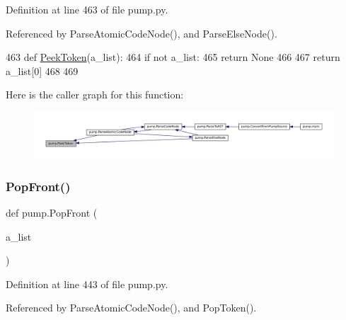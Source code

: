 Definition at line 463 of file pump.\+py.



Referenced by Parse\+Atomic\+Code\+Node(), and Parse\+Else\+Node().


\begin{DoxyCode}
463 \textcolor{keyword}{def }\hyperlink{namespacepump_ab12085e099ab4bd0cd968efdc435ec31}{PeekToken}(a\_list):
464   \textcolor{keywordflow}{if} \textcolor{keywordflow}{not} a\_list:
465     \textcolor{keywordflow}{return} \textcolor{keywordtype}{None}
466 
467   \textcolor{keywordflow}{return} a\_list[0]
468 
469 
\end{DoxyCode}
Here is the caller graph for this function\+:
\nopagebreak
\begin{figure}[H]
\begin{center}
\leavevmode
\includegraphics[width=350pt]{namespacepump_ab12085e099ab4bd0cd968efdc435ec31_icgraph}
\end{center}
\end{figure}
\mbox{\label{namespacepump_a8e2ff118da88397e88ccf68ebcd2df79}} 
\subsubsection{\texorpdfstring{Pop\+Front()}{PopFront()}}
{\footnotesize\ttfamily def pump.\+Pop\+Front (\begin{DoxyParamCaption}\item[{}]{a\+\_\+list }\end{DoxyParamCaption})}



Definition at line 443 of file pump.\+py.



Referenced by Parse\+Atomic\+Code\+Node(), and Pop\+Token().


